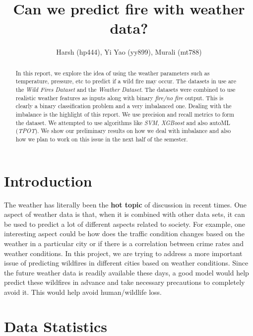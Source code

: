 \documentclass[10pt]{article}
\begin{document}
\title{\bf Can we predict fire with weather data?}
\author{Harsh (hp444), Yi Yao (yy899), Murali (mt788)}
\maketitle

\begin{abstract}
In this report, we explore the idea of using the weather parameters such as
temperature, pressure, etc to predict if a wild fire may occur. The datasets in
use are the \textit{Wild Fires Dataset} and the \textit{Weather Dataset}.
The datasets were combined to use realistic weather features as inputs along
with binary \textit{fire/no fire} output. This is clearly a binary
classification problem and a very imbalanced one. Dealing with the imbalance is
the highlight of this report. We use precision and recall metrics to form the
dataset. We attempted to use algorithms like \textit{SVM, XGBoost} and also
autoML (\textit{TPOT}). We show our preliminary results on how we deal with
imbalance and also how we plan to work on this issue in the next half of the
semester.\par
\end{abstract}

\section{Introduction}

The weather has literally been the \textbf{hot topic} of discussion in recent
times. One aspect of weather data is that, when it is combined with other data
sets, it can be used to predict a lot of different aspects related to society.
For example, one interesting aspect could be how does the traffic condition
changes based on the weather in a particular city or if there is a correlation
between crime rates and weather conditions. In this project, we are trying to
address a more important issue of predicting wildfires in different cities
based on weather conditions. Since the future weather data is readily available
these days, a good model would help predict these wildfires in advance and take
necessary precautions to completely avoid it. This would help avoid
human/wildlife loss.\par

\section{Data Statistics}
\end{document}
